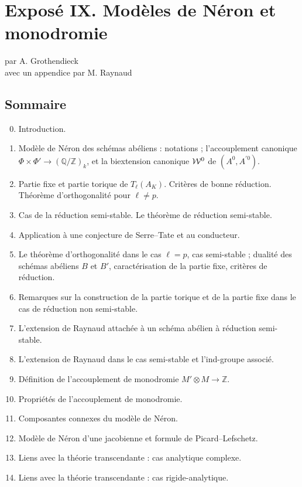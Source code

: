 \documentclass[11pt]{article}
\providecommand{\Z}{\mathbb Z}
\providecommand{\Q}{\mathbb Q}
\begin{document}
\section*{Expos\'e IX. Mod\`eles de N\'eron et monodromie}
\begin{center}
par A. Grothendieck\\
avec un appendice par M. Raynaud
\end{center}

\subsection*{Sommaire}
\begin{enumerate}[label=\arabic*.]
\setcounter{enumi}{-1}
\item Introduction.
\item Mod\`ele de N\'eron des sch\'emas ab\'eliens : notations ; l'accouplement canonique \(\Phi\times\Phi'\to(\Q/\Z)_k\), et la biextension canonique \(\mathcal W^0\) de \((A^0,A^{\prime 0})\).
\item Partie fixe et partie torique de \(T_\ell(A_K)\). Crit\`eres de bonne r\'eduction. Th\'eor\`eme d'orthogonalit\'e pour \(\ell\ne p\).
\item Cas de la r\'eduction semi-stable. Le th\'eor\`eme de r\'eduction semi-stable.
\item Application \`a une conjecture de Serre--Tate et au conducteur.
\item Le th\'eor\`eme d'orthogonalit\'e dans le cas \(\ell=p\), cas semi-stable ; dualit\'e des sch\'emas ab\'eliens \(B\) et \(B'\), caract\'erisation de la partie fixe, crit\`eres de r\'eduction.
\item Remarques sur la construction de la partie torique et de la partie fixe dans le cas de r\'eduction non semi-stable.
\item L'extension de Raynaud attach\'ee \`a un sch\'ema ab\'elien \`a r\'eduction semi-stable.
\item L'extension de Raynaud dans le cas semi-stable et l'ind-groupe associ\'e.
\item D\'efinition de l'accouplement de monodromie \(M'\otimes M\to\Z\).
\item Propri\'et\'es de l'accouplement de monodromie.
\item Composantes connexes du mod\`ele de N\'eron.
\item Mod\`ele de N\'eron d'une jacobienne et formule de Picard--Lefschetz.
\item Liens avec la th\'eorie transcendante : cas analytique complexe.
\item Liens avec la th\'eorie transcendante : cas rigide-analytique.
\end{enumerate}
\end{document}
